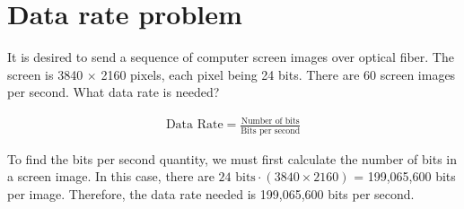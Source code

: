 
\section{Data rate problem}
It is desired to send a sequence of computer screen images over optical fiber. The screen is 3840 $\times$ 2160 pixels, each pixel being 24 bits. There are 60 screen images per second. What data rate is needed?

\begin{align*}
	\text{Data Rate} = \frac{\text{Number of bits}}{\text{Bits per second}}
\end{align*}

To find the bits per second quantity, we must first calculate the number of bits in a screen image. In this case, there are $24 \text{ bits} \cdot (3840 \times 2160)$ = 199,065,600 bits per image. Therefore, the data rate needed is 199,065,600 bits per second.

\section{}
\section{}
\section{}
\section{}
\section{}
\section{}
